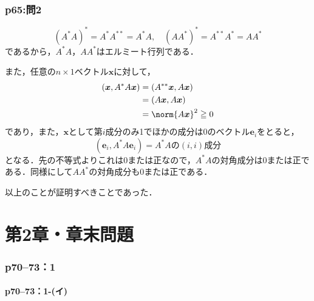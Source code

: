 \section*{p65:問2}

\begin{tproof}
  \[
    (A^\ast A)^{\ast} = A^{\ast} A^{\ast \ast} = A^{\ast} A, \quad (A A^{\ast})^\ast = A^{\ast \ast} A^\ast =A A^{\ast}
  \]
  であるから，$A^\ast A$，$A A^{\ast}$はエルミート行列である．

  また，任意の$n \times 1$ベクトル$\bm{x}$に対して，
  \begin{align*}
    (\bm{x}, A^{\ast}A \bm{x}) & = (A^{\ast \ast} \bm{x}, A \bm{x}) \\
                               & = (A \bm{x}, A \bm{x})             \\
                               & = \norm{A \bm{x}}^2 \geqq 0
  \end{align*}
  であり，また，$\bm{x}$として第$i$成分のみ1でほかの成分は$0$のベクトル$\bm{e}_i$をとると，
  \[
    (\bm{e}_i, A^{\ast}A \bm{e}_i) = \text{$A^{\ast}A$の$(i,i)$成分}
  \]
  となる．先の不等式よりこれは$0$または正なので，$A^{\ast}A$の対角成分は$0$または正である．同様にして$AA^{\ast}$の対角成分も$0$または正である．

  以上のことが証明すべきことであった．
\end{tproof}


\part*{第2章・章末問題}

\section*{p70--73：1}

\subsection*{p70--73：1-(イ)}

